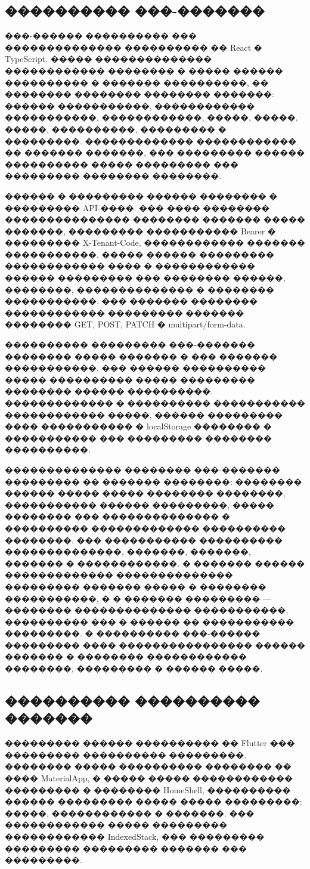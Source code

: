 \subsection{���������� ���-�������}

���-������ ���������� ��� �������������� ���������� �� React � TypeScript. ����� �������������� ������������ �������� � ����� ������ ���������� � ������� ����������, �� �������� �������� �������� �������: ������ �����������, ������������ �����������, ������������, �����, �����, �����, ����������, ��������� � ���������. ������������� ������������ �� ������� �������, ��� ��������� ������ ���������� ����� ��������� ��� ��������� �������� ��������.

������ � ��������� ������ �������� � ��������� API-����. ��� ���� �������� ��������������� �������� ������� ����� �������, ��������� ����������� Bearer � ��������� X-Tenant-Code, ������������ ������� �����������. ����� ������ ��������� ������������ ���� � ������������ ������ ��������� ��� �������� ������, ��������, �������������� � �������� �����������. ��� ������� �������� ������������ ��������� ������� �������� GET, POST, PATCH � multipart/\allowbreak form-data.

���������� ��������� ���-������� �������� ����� ������� � ��� ������� �����������. ��� ������ ���������� ����� ���������� ����� ��������� �������� ������ ����������. ������������� � ���������� ����������� ������������ �����, ������ ��������� ���� ����������� � localStorage �������� � ����������� ��� ��������� �������� ����������.

�������������� �������� ���-������� ��������� �� ������� ��������: �������� ������ ����� ����� �������� ��������, ����������� ������ ���������, ����� �������� ��� �������������� � ���������� ������������� ���������� ��������. ��� ����������� ���������� ��������������, �������, �������, ������� � ������������. � ������� ������ ������������� �������������� ��������� ������� ����� � �������� �����������, � � ������� ��������� --- �������� �������������� �����������, ���������� ��� � ������ �� ����������� ���������. � ���������� ���-������ ��������� ���� ���������������� ������ ������� � �������� ������������ ��������, ��������� � ������ �����.

\subsection{���������� ���������� �������}

��������� ������ ���������� �� Flutter ��� ��������� ���������� ���������. �������� ����� ���������� �������� �� ���� MaterialApp, � ����� ����� ������������ ��������� � �������� HomeShell, ���������� ������ ��������� ����� ����� ���������: �����, ������������ � �������. ��� ������������ ����� ��������� ������������ IndexedStack, ��� ��������� ��������� ��������� ������� ��� ���������.

